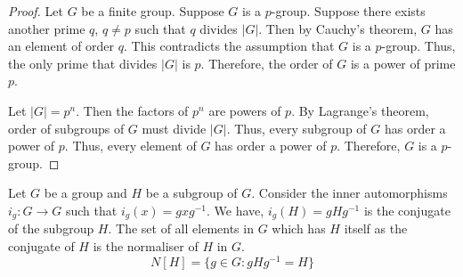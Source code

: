 \begin{proof}
	Let $G$ be a finite group.
	Suppose $G$ is a $p$-group.
	Suppose there exists another prime $q$, $q \ne p$ such that $q$ divides $|G|$.
	Then by Cauchy's theorem, $G$ has an element of order $q$.
	This contradicts the assumption that $G$ is a $p$-group.
	Thus, the only prime that divides $|G|$ is $p$.
	Therefore, the order of $G$ is a power of prime $p$.

	Let $|G|=p^n$.
	Then the factors of $p^n$ are powers of $p$.
	By Lagrange's theorem, order of subgroups of $G$ must divide $|G|$.
	Thus, every subgroup of $G$ has order a power of $p$.
	Thus, every element of $G$ has order a power of $p$.
	Therefore, $G$ is a $p$-group.
\end{proof}

\begin{definition}
	Let $G$ be a group and $H$ be a subgroup of $G$.
	Consider the inner automorphisms $i_g : G \to G$ such that $i_g(x) = gxg^{-1}$.
	We have, $i_g(H) = gHg^{-1}$ is the conjugate of the subgroup $H$.
	The set of all elements in $G$ which has $H$ itself as the conjugate of $H$ is the normaliser of $H$ in $G$.
	\begin{equation}
		N[H] = \{ g \in G : gHg^{-1} = H\}
	\end{equation}
\end{definition}

